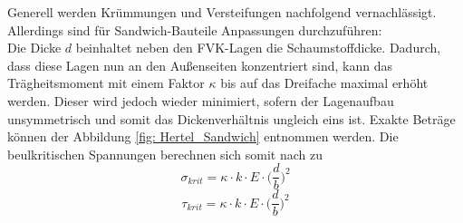 \noindent Generell werden Krümmungen und Versteifungen nachfolgend vernachlässigt. Allerdings sind für Sandwich-Bauteile Anpassungen durchzuführen:\\
Die Dicke $d$ beinhaltet neben den FVK-Lagen die Schaumstoffdicke. Dadurch, dass diese Lagen nun an den Außenseiten konzentriert sind, kann das Trägheitsmoment mit einem Faktor $\kappa$ bis auf das Dreifache maximal erhöht werden. Dieser wird jedoch wieder minimiert, sofern der Lagenaufbau unsymmetrisch und somit das Dickenverhältnis ungleich eins ist. Exakte Beträge können der Abbildung \ref{fig: Hertel_Sandwich} entnommen werden. Die beulkritischen Spannungen berechnen sich somit nach \cite{item1} zu
\begin{equation}
	\sigma_{krit}=\kappa\cdot k\cdot E\cdot\Big(\frac{d}{b}\Big)^{2}
\end{equation}
\begin{equation}
	\tau_{krit}=\kappa\cdot k\cdot E\cdot\Big(\frac{d}{b}\Big)^{2}
\end{equation}

